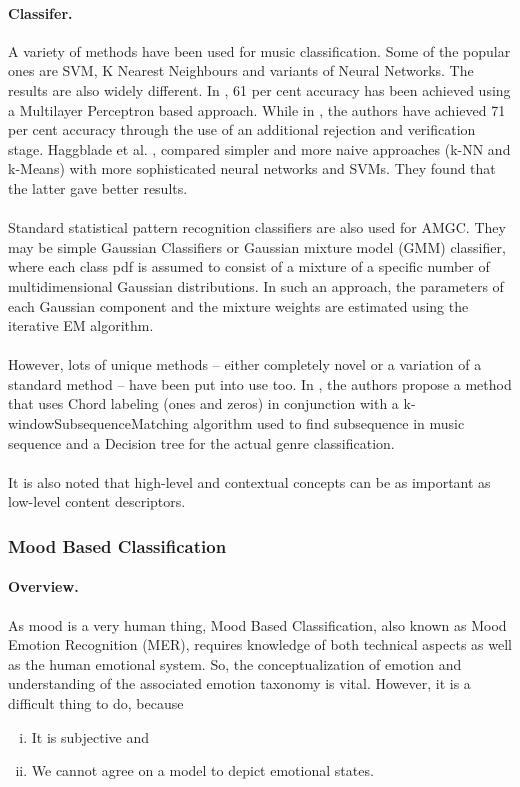 \paragraph{Classifer.}

A variety of methods have been used for music classification. Some of the popular ones are SVM, K Nearest Neighbours and variants of Neural Networks.
The results are also widely different. In \cite{Neumayer2004}, 61 per cent accuracy has been achieved using a Multilayer Perceptron based approach. 
While in \cite{Koerich2013}, the authors have achieved 71 per cent accuracy through the use of an additional rejection and verification stage.
Haggblade et al. \cite{Haggblade2011}, compared simpler and more naive approaches (k-NN and k-Means) with more sophisticated neural networks and SVMs. 
They found that the latter gave better results.\\
\\
Standard statistical pattern recognition classifiers are also used for AMGC.
They may be simple Gaussian Classifiers or Gaussian mixture model (GMM) classifier, where each class pdf is assumed to consist of a mixture of a specific number of multidimensional Gaussian distributions.
In such an approach, the parameters of each Gaussian component and the mixture weights are estimated using the iterative EM algorithm.\\
\\
However, lots of unique methods -- either completely novel or a variation of a standard method -- have been put into use too. In \cite{Nasridinov2014}, the authors
propose a method that uses Chord labeling (ones and zeros) in conjunction with a k-windowSubsequenceMatching algorithm used to find subsequence in music sequence
and a Decision tree for the actual genre classification.\\
\\
It is also noted that high-level and contextual concepts can be as important as low-level content descriptors. \cite{Anglade2010} 

\subsubsection{Mood Based Classification}

\paragraph{Overview.}

As mood is a very human thing, Mood Based Classification, also known as Mood Emotion Recognition (MER), requires knowledge of both technical aspects as well as the human emotional system.
So, the conceptualization of emotion and understanding of the associated emotion taxonomy is vital. However, it is a difficult thing to do, because 
\begin{enumerate}[(i)]
        \item It is subjective and 

        \item We cannot agree on a model to depict emotional states.
        \end{enumerate}

